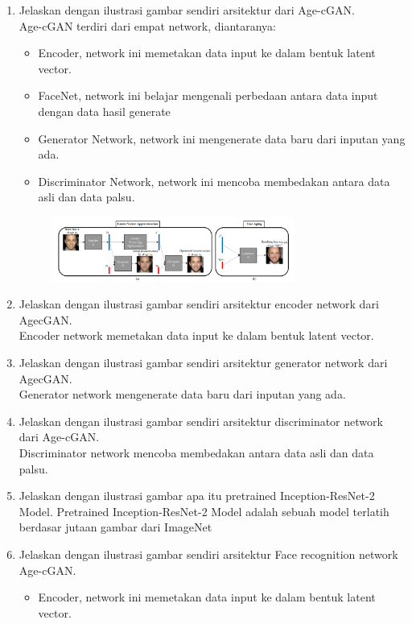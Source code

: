 \begin{enumerate}
\begin{figure}[H]
		\centering
	\end{figure}
	\item Jelaskan dengan ilustrasi gambar sendiri arsitektur dari Age-cGAN.\\
    Age-cGAN terdiri dari empat network, diantaranya:
    \begin{itemize}
        \item Encoder, network ini memetakan data input ke dalam bentuk latent vector.
        \item FaceNet, network ini belajar mengenali perbedaan antara data input dengan data hasil generate
        \item Generator Network, network ini mengenerate data baru dari inputan yang ada.
        \item Discriminator Network, network ini mencoba membedakan antara data asli dan data palsu.
    \end{itemize}
	\begin{figure}[H]
		\includegraphics[width=8cm]{figures/1174006/chapter9/teori/agecgan.png}
		\centering
	\end{figure}
    \item Jelaskan dengan ilustrasi gambar sendiri arsitektur encoder network dari AgecGAN.\\
    Encoder network memetakan data input ke dalam bentuk latent vector.
    \item Jelaskan dengan ilustrasi gambar sendiri arsitektur generator network dari AgecGAN.\\
    Generator network mengenerate data baru dari inputan yang ada.
    \item Jelaskan dengan ilustrasi gambar sendiri arsitektur discriminator network dari Age-cGAN.\\
    Discriminator network mencoba membedakan antara data asli dan data palsu.
    \item Jelaskan dengan ilustrasi gambar apa itu pretrained Inception-ResNet-2 Model.
    Pretrained Inception-ResNet-2 Model adalah sebuah model terlatih berdasar jutaan gambar dari ImageNet
    \item Jelaskan dengan ilustrasi gambar sendiri arsitektur Face recognition network Age-cGAN.
    \begin{itemize}
        \item Encoder, network ini memetakan data input ke dalam bentuk latent vector.

\end{itemize}
\end{enumerate}
